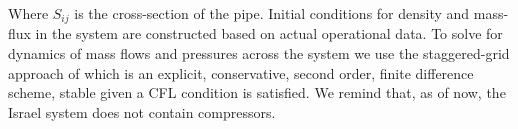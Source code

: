 Where $S_{ij}$ is the cross-section of the pipe. Initial conditions for density and mass-flux in the system are constructed based on actual operational data. To solve for dynamics of mass flows and pressures across the system we use the staggered-grid approach of \cite{Gyrya2019AnExplicit} which is an explicit, conservative, second order, finite difference scheme, stable given a CFL condition is satisfied.
We remind that, as of now, the  Israel system does not contain compressors.
\begin{comment}
This approach solves the governing system of PDEs, \ref{eq:governingEq1},\ref{eq:governingEq2} on two separate grids.

Then, on these grids we can write \(\rho(\tau_n,\xi_j) = \rho_n^j\). Using finite difference, and defining \(\beta = \frac{\lambda L}{2D}\), we write the dynamical equations \ref{eq:governingEq1}, \ref{eq:governingEq2} in the discretized forms:
\begin{align}
  &\frac{\rho^{n+1}_j - \rho^n_j}{\Delta \tau} + \frac{\phi^m_{j} - \phi^m_{j-1}}{\Delta \xi} = 0\\
  &\frac{\phi_j^{m+1} - \phi_j^m}{\Delta \tau} + \frac{\rho_{i+1}^{n+1} - \rho_i^{n+1}}{\Delta \xi} = -\beta \frac{ (\phi |\phi |)^{n+1}_j}{\rho_j^{n+1}} \approx -\beta \frac{ (\phi |\phi |)^{m+1}_j + (\phi |\phi |)^{m}_j}{\rho_{i+1}^{n+1} + \rho_{i}^{n+1}} \label{eq:discretizedMomentum}\\
  & \qquad \implies \phi_j^{m+1} + \beta \Delta \tau \frac{ (\phi |\phi|)^{m+1}_j}{\rho_i^{n+1} + \rho_{i+1}^{n+1}} =
    \phi_j^m - \frac{\Delta \tau}{\Delta \xi}\left( \rho^{n+1}_{i+1} - \rho_i^{n+1} \right) - \beta \Delta t \frac{ (\phi |\phi|)^{m}_j}{\rho_i^{n+1} + \rho_{i+1}^{n+1}}
\end{align}


We can solve the former to find an equation to advance \(\rho\):
\begin{equation}
  \rho^{n+1}_j = \left( \frac{\phi^m_{j-1} - \phi^m_{j}}{\Delta \xi} \right) \Delta \tau + \rho^n_j\\
\end{equation}

However, the discretized momentum equation \ref{eq:discretizedMomentum} is implicit.

Labeling \(y\) as the RHS of \ref{eq:discretizedMomentum}, i.e.,
\begin{equation}
y = \phi_j^m - \frac{\Delta \tau}{\Delta \xi}(\rho_{i+1}^{n+1} - \rho_i^{n+1}) - \beta \Delta \tau \frac{ (\phi |\phi|)^m_j}{\rho_i^{n+1} + \rho_{i+1}^{n+1}}
\end{equation}
We have an equation of the form:
\begin{align}
  &F(x) = y \\
  &x = \phi_j^{m+1} \\
  F(x) = x + \beta \Delta \tau \frac{ (x |x|)}{\rho_i^{n+1} + \rho_{i+1}^{n+1}}
\end{align}

We can write the inverse of \(F\) as
\begin{equation}
x = F^{-1}(y) = \text{sign}(y)\frac{-1 + \sqrt{1+4a|y|}}{2a}
\end{equation}

And because we know the value of \(y\), we can readily solve for \(x := \phi_j^{m+1}\).

\end{comment}


